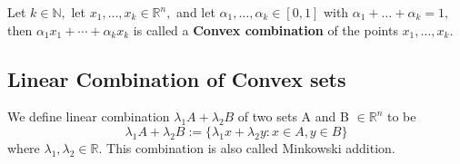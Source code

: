 \documentclass[oneside]{book}
\begin{document}
	Let $k \in \mathbb{N},$ let $x_{1}, \ldots, x_{k} \in \mathbb{R}^{n},$ and let $\alpha_{1}, \ldots, \alpha_{k} \in[0,1]$ with $\alpha_{1}+\ldots+\alpha_{k}=1,$ then
	$\alpha_{1} x_{1}+\cdots+\alpha_{k} x_{k}$ is called a \textbf{Convex combination} of the points $x_{1}, \ldots, x_{k}$.
	
	
	
	
	
	
	
	
	
	\subsection{Linear Combination of Convex sets}
	\label{ss:5}
	We define linear combination $\lambda_{1} A+\lambda_{2} B$ of two sets A and B $\in \mathbb{R}^n$ to be 
	$$\lambda_{1} A+\lambda_{2} B:=\{\lambda_{1} x+\lambda_{2} y: x \in A, y \in B\}$$ where $\lambda_{1}, \lambda_{2} \in \mathbb{R}$.
	This combination is also called Minkowski addition.
	
\end{document}
